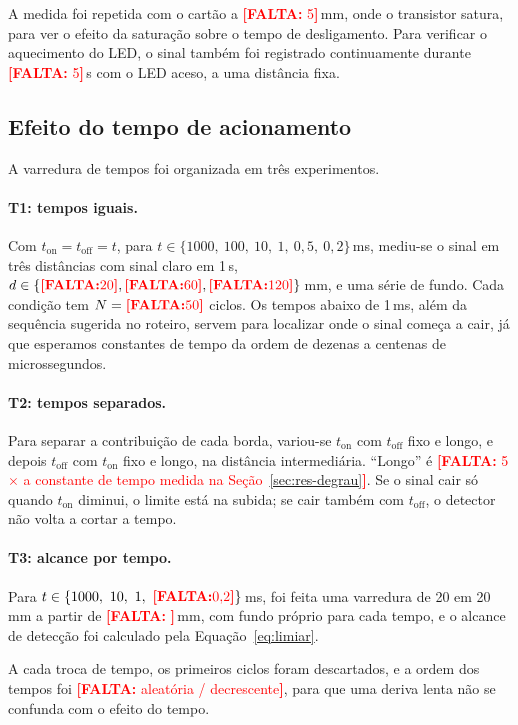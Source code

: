 \documentclass[11pt,a4paper]{article}
\newcommand{\pendente}[1]{\textcolor{red}{\textbf{[FALTA:} #1\textbf{]}}}
\begin{document}
A medida foi repetida com o cartão a \pendente{5}\,mm, onde o transistor satura, para ver o efeito da saturação sobre o tempo de desligamento. Para verificar o aquecimento do LED, o sinal também foi registrado continuamente durante \pendente{5}\,s com o LED aceso, a uma distância fixa.

\subsection{Efeito do tempo de acionamento}
\label{sec:met-tempo}

A varredura de tempos foi organizada em três experimentos.

\paragraph{T1: tempos iguais.} Com $t_\text{on} = t_\text{off} = t$, para $t \in \{1000,\ 100,\ 10,\ 1,\ 0{,}5,\ 0{,}2\}$\,ms, mediu-se o sinal em três distâncias com sinal claro em 1\,s, $d \in \{\pendente{20}, \pendente{60}, \pendente{120}\}$\,mm, e uma série de fundo. Cada condição tem $N = \pendente{50}$ ciclos. Os tempos abaixo de 1\,ms, além da sequência sugerida no roteiro, servem para localizar onde o sinal começa a cair, já que esperamos constantes de tempo da ordem de dezenas a centenas de microssegundos.

\paragraph{T2: tempos separados.} Para separar a contribuição de cada borda, variou-se $t_\text{on}$ com $t_\text{off}$ fixo e longo, e depois $t_\text{off}$ com $t_\text{on}$ fixo e longo, na distância intermediária. ``Longo'' é \pendente{5$\times$ a constante de tempo medida na Seção~\ref{sec:res-degrau}}. Se o sinal cair só quando $t_\text{on}$ diminui, o limite está na subida; se cair também com $t_\text{off}$, o detector não volta a cortar a tempo.

\paragraph{T3: alcance por tempo.} Para $t \in \{1000,\ 10,\ 1,\ \pendente{0{,}2}\}$\,ms, foi feita uma varredura de 20 em 20\,mm a partir de \pendente{}\,mm, com fundo próprio para cada tempo, e o alcance de detecção foi calculado pela Equação~\eqref{eq:limiar}.

A cada troca de tempo, os primeiros ciclos foram descartados, e a ordem dos tempos foi \pendente{aleatória / decrescente}, para que uma deriva lenta não se confunda com o efeito do tempo.
\end{document}
